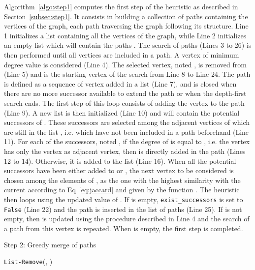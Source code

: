 \documentclass{scrartcl}
\theoremstyle{plain}
\begin{document}
Algorithm~\ref{algo:step1} computes the first step of the heuristic as described 
in Section~\ref{subsec:step1}. It consists in building a collection of paths 
containing the vertices of the graph, each  path traversing the graph following 
its structure. Line 1 initializes a list  containing all the vertices of the 
graph, while Line 2 initializes an empty list which will contain the paths . The 
search of paths (Lines 3 to 26) is then performed until all vertices are 
included in a path. A vertex of  minimum degree value is considered (Line 4). 
The selected vertex, noted , is removed from  (Line 5) and is the 
starting vertex of the search from Line 8 to Line 24. The path is defined as a 
sequence of vertex added in a list  (Line 7), and is closed when there are no 
more successor available to extend the path or when the depth-first search ends. 
The first step of this loop consists of adding the vertex  to the path  
(Line 9). A new list  is then initialized (Line 10) and will contain the 
potential successors of . These successors are selected among the adjacent 
vertices of  which are still in the list , i.e. which have not been 
included in a path beforehand (Line 11). For each of the successors, noted , 
if the degree of  is equal to , i.e. the vertex  has only the vertex 
 as adjacent vertex, then  is directly added in the path (Lines 12 to 
14). Otherwise, it is added to the list  (Line 16). When all the potential 
successors have been either added to  or , the next vertex to be 
considered is chosen among the elements of , as the one with the highest 
similarity with the current  according to Eq~\ref{eq:jaccard} and given by 
the function . The heuristic then loops using the 
updated value of . If  is empty, \texttt{exist\_successors} is set to 
\texttt{False} (Line 22)  and the path is inserted in the list of paths (Line 
25). If  is not empty, then  is updated using the procedure described in 
Line 4 and the search of a path from this vertex is repeated. When  is empty, 
the first step is completed.

\begin{algorithm}[!ht]
  \caption{Step 2: Greedy merge of paths}
  \label{algo:step2}
  \begin{algorithmic}[1]
	\REQUIRE 
    \STATE 
    \STATE \texttt{List-Remove}(, )
    \STATE 
    \STATE 
	\STATE 
	\ELSE
	\STATE 
    \ENDIF
    \STATE 
    \ENDWHILE
    \STATE
    \STATE 
    \FOR{}
    \STATE 
    \ENDFOR
    \RETURN 
  \end{algorithmic}
\end{algorithm}
\end{document}

